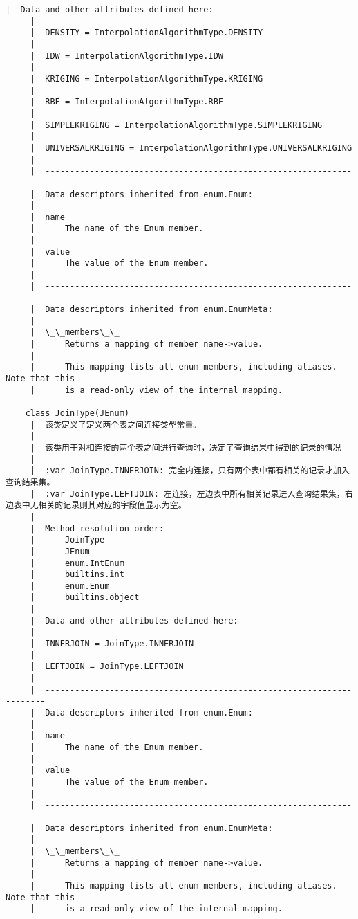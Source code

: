\documentclass[11pt]{article}
\begin{document}
\begin{Verbatim}[commandchars=\\\{\}]
     |  Data and other attributes defined here:
     |  
     |  DENSITY = InterpolationAlgorithmType.DENSITY
     |  
     |  IDW = InterpolationAlgorithmType.IDW
     |  
     |  KRIGING = InterpolationAlgorithmType.KRIGING
     |  
     |  RBF = InterpolationAlgorithmType.RBF
     |  
     |  SIMPLEKRIGING = InterpolationAlgorithmType.SIMPLEKRIGING
     |  
     |  UNIVERSALKRIGING = InterpolationAlgorithmType.UNIVERSALKRIGING
     |  
     |  ----------------------------------------------------------------------
     |  Data descriptors inherited from enum.Enum:
     |  
     |  name
     |      The name of the Enum member.
     |  
     |  value
     |      The value of the Enum member.
     |  
     |  ----------------------------------------------------------------------
     |  Data descriptors inherited from enum.EnumMeta:
     |  
     |  \_\_members\_\_
     |      Returns a mapping of member name->value.
     |      
     |      This mapping lists all enum members, including aliases. Note that this
     |      is a read-only view of the internal mapping.
    
    class JoinType(JEnum)
     |  该类定义了定义两个表之间连接类型常量。
     |  
     |  该类用于对相连接的两个表之间进行查询时，决定了查询结果中得到的记录的情况
     |  
     |  :var JoinType.INNERJOIN: 完全内连接，只有两个表中都有相关的记录才加入查询结果集。
     |  :var JoinType.LEFTJOIN: 左连接，左边表中所有相关记录进入查询结果集，右边表中无相关的记录则其对应的字段值显示为空。
     |  
     |  Method resolution order:
     |      JoinType
     |      JEnum
     |      enum.IntEnum
     |      builtins.int
     |      enum.Enum
     |      builtins.object
     |  
     |  Data and other attributes defined here:
     |  
     |  INNERJOIN = JoinType.INNERJOIN
     |  
     |  LEFTJOIN = JoinType.LEFTJOIN
     |  
     |  ----------------------------------------------------------------------
     |  Data descriptors inherited from enum.Enum:
     |  
     |  name
     |      The name of the Enum member.
     |  
     |  value
     |      The value of the Enum member.
     |  
     |  ----------------------------------------------------------------------
     |  Data descriptors inherited from enum.EnumMeta:
     |  
     |  \_\_members\_\_
     |      Returns a mapping of member name->value.
     |      
     |      This mapping lists all enum members, including aliases. Note that this
     |      is a read-only view of the internal mapping.
    

\end{Verbatim}
\end{document}

